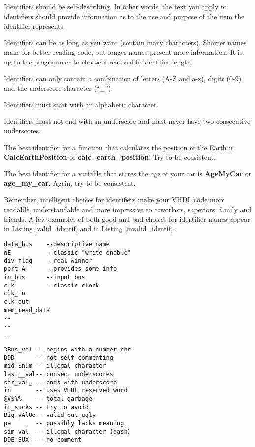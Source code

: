 \begin{my_list}
\item Identifiers should be self-describing. In other words, the text you apply to identifiers should provide information as to the use and purpose of the item the identifier represents.
\item Identifiers can be as long as you want (contain many characters). Shorter names make for better reading code, but longer names present more information. It is up to the programmer to choose a reasonable identifier length.
\item Identifiers can only contain a combination of letters (A-Z and a-z), digits (0-9) and the underscore character (``\_'').
\item Identifiers must start with an alphabetic character.
\item Identifiers must not end with an underscore and must never have two consecutive underscores.
\item The best identifier for a function that calculates the position of the Earth is \textbf{CalcEarthPosition} or \textbf{calc\_earth\_position}. Try to be consistent.
\item The best identifier for a variable that stores the age of your car is \textbf{AgeMyCar} or \textbf{age\_my\_car}. Again, try to be consistent.
\end{my_list}
Remember, intelligent choices for identifiers make your VHDL code more readable, understandable and more impressive to coworkers, superiors, family and friends. A few examples of both good and bad choices for identifier names appear in Listing \ref{valid_identif} and in Listing \ref{invalid_identif}.\\
\begin{minipage}[lt]{0.49\linewidth}
\vspace{5pt}
\begin{lstlisting}[label=valid_identif, caption=Valid identifies.]
data_bus	--descriptive name
WE			--classic "write enable"
div_flag	--real winner
port_A		--provides some info
in_bus		--input bus
clk			--classic clock
clk_in
clk_out
mem_read_data
--
--
--
\end{lstlisting}
\end{minipage}
\begin{minipage}[tr]{0.49\linewidth}
\vspace{5pt}
\begin{flushright}
\begin{lstlisting}[label=invalid_identif, caption=Invalid identifies.]
3Bus_val -- begins with a number chr
DDD      -- not self commenting
mid_$num -- illegal character
last__val-- consec. underscores
str_val_ -- ends with underscore
in       -- uses VHDL reserved word
@#$%%    -- total garbage
it_sucks -- try to avoid
Big_vAlUe-- valid but ugly
pa       -- possibly lacks meaning
sim-val  -- illegal character (dash)
DDE_SUX  -- no comment
\end{lstlisting}
\end{flushright}
\end{minipage}
\clearpage
